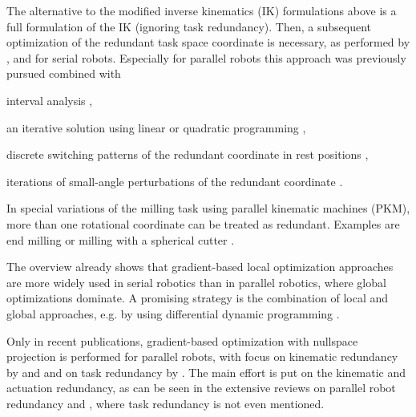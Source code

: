 \documentclass[a4paper,twoside]{article}
\begin{document}
The alternative to the modified inverse kinematics (IK) formulations above is a full formulation of the IK (ignoring task redundancy).
Then, a subsequent optimization of the redundant task space coordinate is necessary, as performed by \cite{ZhuQuCaoYan2013}, \cite{GuoDonKe2015} and \cite{MousaviGagBouRay2018} for serial robots.
Especially for parallel robots this approach was previously pursued combined with
\begin{compactitem}
\item interval analysis \cite{MerletPerDan2000}, 
\item an iterative solution using linear or quadratic programming \cite{OenWan2007},
\item discrete switching patterns of the redundant coordinate in rest positions \cite{KotlarskiDoHeiOrt2010},
\item iterations of small-angle perturbations of the redundant coordinate \cite{GaoCheGaoXia2019}.
\end{compactitem}

In special variations of the milling task using parallel kinematic machines (PKM), more than one rotational coordinate can be treated as redundant.
Examples are end milling \cite{ShawChe2001} or milling with a spherical cutter \cite{SmirnovPlyMir2013}.

The overview already shows that gradient-based local optimization approaches are more widely used in serial robotics than in parallel robotics, where global optimizations dominate.
A promising strategy is the combination of local and global approaches, e.g. by using differential dynamic programming \cite{SantosSil2017}.


Only in recent publications, gradient-based optimization with nullspace projection is performed for parallel robots, with focus on kinematic redundancy by \cite{GosselinSch2016} and \cite{SantosSil2017} and on task redundancy by \cite{AgarwalNasBan2016}.
The main effort is put on the kinematic and actuation redundancy, as can be seen in the extensive reviews on parallel robot redundancy \cite{LucesMilBen2017} and \cite{GosselinSch2018}, where task redundancy is not even mentioned.
\end{document}

